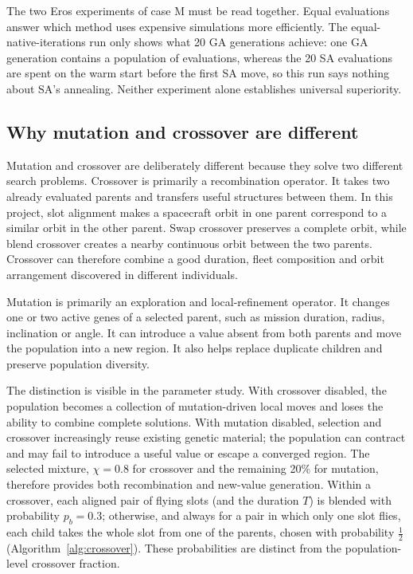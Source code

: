 The two Eros experiments of case M must be read together. Equal evaluations answer which method uses
expensive simulations more efficiently. The equal-native-iterations run only shows what 20 GA
generations achieve: one GA generation contains a population of evaluations, whereas the 20 SA
evaluations are spent on the warm start before the first SA move, so this run says nothing about
SA's annealing. Neither experiment alone establishes universal superiority.

\subsection{Why mutation and crossover are different}
\label{sec:ga-operators}

Mutation and crossover are deliberately different because they solve two different search problems.
Crossover is primarily a recombination operator. It takes two already evaluated parents and transfers
useful structures between them. In this project, slot alignment makes a spacecraft orbit in one
parent correspond to a similar orbit in the other parent. Swap crossover preserves a complete orbit,
while blend crossover creates a nearby continuous orbit between the two parents. Crossover can
therefore combine a good duration, fleet composition and orbit arrangement discovered in different
individuals.

Mutation is primarily an exploration and local-refinement operator. It changes one or two active
genes of a selected parent, such as mission duration, radius, inclination or angle. It can introduce
a value absent from both parents and move the population into a new region. It also helps replace
duplicate children and preserve population diversity.

The distinction is visible in the parameter study. With crossover disabled, the population becomes
a collection of mutation-driven local moves and loses the ability to combine complete solutions.
With mutation disabled, selection and crossover increasingly reuse existing genetic material; the
population can contract and may fail to introduce a useful value or escape a converged region. The
selected mixture, $\chi=0.8$ for crossover and the remaining 20\% for mutation, therefore provides
both recombination and new-value generation. Within a crossover, each aligned pair of flying slots
(and the duration $T$) is blended with probability $p_b=0.3$; otherwise, and always for a pair in
which only one slot flies, each child takes the whole slot from one of the parents, chosen with
probability $\tfrac12$ (Algorithm~\ref{alg:crossover}). These probabilities are distinct from the
population-level crossover fraction.

